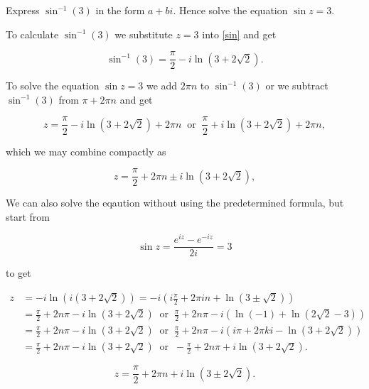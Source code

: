 \documentclass[english,a4paper,12pt]{report}
\begin{document}
{Express \(\sin ^{-1} (3)\) in the form \(a+bi\). Hence solve the equation \(\sin z = 3\).}
{To calculate \(\sin ^{-1} (3)\) we substitute \(z = 3\) into \cref{sin} and get
 
\begin{equation}
    \sin ^{-1} (3) = \frac{\pi }{2} - i \ln (3+2\sqrt{2} ). 
\end{equation}
 
To solve the equation \(\sin z = 3\) we add \(2\pi n\) to \(\sin ^{-1} (3)\) or we subtract \(\sin ^{-1} (3) \) from \( \pi + 2\pi n\) and get

\begin{equation}
    z = \frac{\pi }{2} - i \ln (3+2\sqrt{2} ) + 2\pi n ~\text { or } ~ \frac{\pi }{2} + i \ln (3+2\sqrt{2} ) + 2\pi n,
\end{equation}

which we may combine compactly as 

\begin{equation}
    z = \frac{\pi }{2} + 2\pi n \pm i \ln (3+2\sqrt{2} ),
\end{equation}

We can also solve the eqaution without using the predetermined formula, but start from

\begin{equation}
    \sin z = \frac{e^{iz}-e^{-iz}  }{2i} = 3 
\end{equation}

to get 

\begin{equation}
    \begin{aligned} 
    z &= -i \ln (i (3+2\sqrt{2} )) = -i \left(i \frac{\pi }{2} + 2\pi in + \ln (3 \pm \sqrt{2} ) \right) \\
    &= \frac{\pi }{2} + 2n\pi - i\ln (3+2\sqrt{2} ) ~\text { or } ~ \frac{\pi }{2} + 2n\pi -i\left( \ln (-1) + \ln (2\sqrt{2}-3 ) \right) \\
    &= \frac{\pi }{2} + 2n\pi -i \ln (3+2\sqrt{2} ) ~\text { or } ~ \frac{\pi }{2} + 2n\pi -i\left( i \pi + 2\pi ki - \ln (3+2 \sqrt{2} ) \right)\\
    &=  \frac{\pi }{2} + 2n\pi -i \ln (3+2\sqrt{2} ) ~\text { or } ~ -\frac{\pi }{2} + 2n\pi + i \ln (3+2\sqrt{2} ).  
    \end{aligned} 
\end{equation}


\begin{equation}
    z = \frac{\pi }{2} + 2\pi n + i \ln (3 \pm 2 \sqrt{2} ).
\end{equation}
~
} 
 
\end{document}
